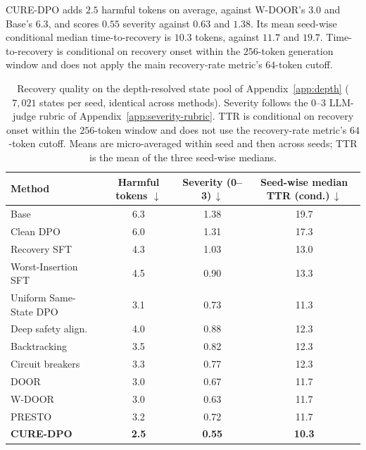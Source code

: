 \documentclass[11pt]{article}
\newcommand{\method}{CURE-DPO}
\begin{document}
\method{} adds \(2.5\) harmful tokens on average, against W-DOOR's \(3.0\) and
Base's \(6.3\), and scores \(0.55\) severity against \(0.63\) and \(1.38\).
Its mean seed-wise conditional median time-to-recovery is \(10.3\) tokens,
against \(11.7\) and \(19.7\). Time-to-recovery is conditional on recovery onset
within the \(256\)-token generation window and does not apply the main
recovery-rate metric's \(64\)-token cutoff.

\begin{table}[t]
  \centering
  \scriptsize
  \setlength{\tabcolsep}{2.4pt}
  \begin{tabular}{lccc}
    \toprule
    Method & \shortstack{Harmful\\tokens \(\downarrow\)}
    & \shortstack{Severity\\(0--3)\,\(\downarrow\)}
    & \shortstack{Seed-wise median\\TTR (cond.)\,\(\downarrow\)} \\
    \midrule
    Base                    & 6.3 & 1.38 & 19.7 \\
    Clean DPO               & 6.0 & 1.31 & 17.3 \\
    Recovery SFT            & 4.3 & 1.03 & 13.0 \\
    Worst-Insertion SFT     & 4.5 & 0.90 & 13.3 \\
    Uniform Same-State DPO  & 3.1 & 0.73 & 11.3 \\
    \midrule
    Deep safety align.      & 4.0 & 0.88 & 12.3 \\
    Backtracking            & 3.5 & 0.82 & 12.3 \\
    Circuit breakers        & 3.3 & 0.77 & 12.3 \\
    DOOR                    & 3.0 & 0.67 & 11.7 \\
    W-DOOR                  & 3.0 & 0.63 & 11.7 \\
    PRESTO                  & 3.2 & 0.72 & 11.7 \\
    \midrule
    \textbf{\method{}}      & \textbf{2.5} & \textbf{0.55} & \textbf{10.3} \\
    \bottomrule
  \end{tabular}
  \caption{Recovery quality on the depth-resolved state pool of
  Appendix~\ref{app:depth} (\(7{,}021\) states per seed, identical across
  methods). Severity follows the \(0\)--\(3\) LLM-judge rubric of
  Appendix~\ref{app:severity-rubric}. TTR is conditional on recovery onset
  within the \(256\)-token window and does not use the recovery-rate metric's
  \(64\)-token cutoff. Means are micro-averaged within seed and then across
  seeds; TTR is the mean of the three seed-wise medians.}
  \label{tab:recovery-quality}
\end{table}
\end{document}
